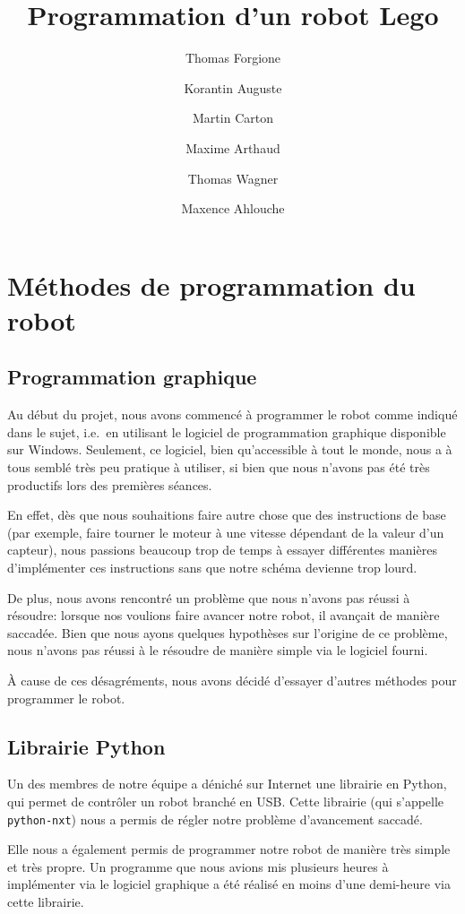 \documentclass{report}
\author{Thomas Forgione \and Korantin Auguste \and Martin Carton \and
Maxime Arthaud \and Thomas Wagner \and Maxence Ahlouche}
\title{Programmation d'un robot Lego}
\begin{document}
\maketitle

\section{Méthodes de programmation du robot}
\subsection{Programmation graphique}

Au début du projet, nous avons commencé à programmer le robot comme
indiqué dans le sujet, i.e.\ en utilisant le logiciel de programmation
graphique disponible sur Windows. Seulement, ce logiciel, bien
qu'accessible à tout le monde, nous a à tous semblé très peu pratique
à utiliser, si bien que nous n'avons pas été très productifs lors des
premières séances.

En effet, dès que nous souhaitions faire autre
chose que des instructions de base (par exemple, faire tourner le
moteur à une vitesse dépendant de la valeur d'un capteur), nous
passions beaucoup trop de temps à essayer différentes manières
d'implémenter ces instructions sans que notre schéma devienne trop
lourd.

De plus, nous avons rencontré un problème que nous n'avons pas réussi
à résoudre: lorsque nos voulions faire avancer notre robot, il
avançait de manière saccadée. Bien que nous ayons quelques hypothèses
sur l'origine de ce problème, nous n'avons pas réussi à le résoudre de
manière simple via le logiciel fourni.

À cause de ces désagréments, nous avons décidé d'essayer
d'autres méthodes pour programmer le robot.

\subsection{Librairie Python}

Un des membres de notre équipe a déniché sur Internet une librairie en
Python, qui permet de contrôler un robot branché en USB. Cette
librairie (qui s'appelle \texttt{python-nxt}) nous a permis de régler
notre problème d'avancement saccadé.

Elle nous a également permis de programmer notre robot de manière très
simple et très propre. Un programme que nous avions mis plusieurs
heures à implémenter via le logiciel graphique a été réalisé en moins
d'une demi-heure via cette librairie.
\end{document}
